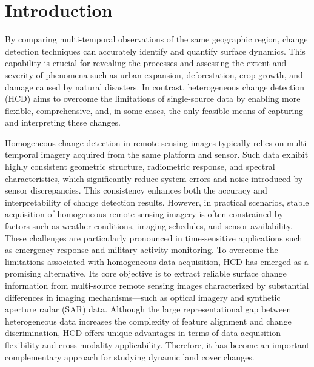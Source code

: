 \documentclass[a4paper,fleqn]{cas-dc}
\begin{document}
\section{Introduction}
By comparing multi-temporal observations of the same geographic region, change detection techniques can accurately identify and quantify surface dynamics. This capability is crucial for revealing the processes and assessing the extent and severity of phenomena such as urban expansion, deforestation, crop growth, and damage caused by natural disasters. In contrast, heterogeneous change detection (HCD) aims to overcome the limitations of single-source data by enabling more flexible, comprehensive, and, in some cases, the only feasible means of capturing and interpreting these changes.

Homogeneous change detection in remote sensing images typically relies on multi-temporal imagery acquired from the same platform and sensor. Such data exhibit highly consistent geometric structure, radiometric response, and spectral characteristics, which significantly reduce system errors and noise introduced by sensor discrepancies. This consistency enhances both the accuracy and interpretability of change detection results. However, in practical scenarios, stable acquisition of homogeneous remote sensing imagery is often constrained by factors such as weather conditions, imaging schedules, and sensor availability. These challenges are particularly pronounced in time-sensitive applications such as emergency response and military activity monitoring. To overcome the limitations associated with homogeneous data acquisition, HCD has emerged as a promising alternative. Its core objective is to extract reliable surface change information from multi-source remote sensing images characterized by substantial differences in imaging mechanisms—such as optical imagery and synthetic aperture radar (SAR) data. Although the large representational gap between heterogeneous data increases the complexity of feature alignment and change discrimination, HCD offers unique advantages in terms of data acquisition flexibility and cross-modality applicability. Therefore, it has become an important complementary approach for studying dynamic land cover changes.
\end{document}
